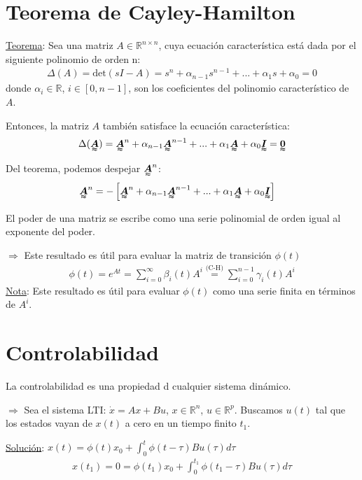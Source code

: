 \section{Teorema de Cayley-Hamilton}
\underline{Teorema}: Sea una matriz $A\in\mathbb{R}^{n\times n}$, cuya ecuación característica está dada por el siguiente polinomio de orden n:
\begin{align*}
    \Delta (A)=\text{det}(sI-A)=s^n+\alpha_{n-1}s^{n-1}+...+\alpha_1s+\alpha_0=0
\end{align*}
donde $\alpha_i\in\mathbb{R}$, $i\in [0,n-1]$, son los coeficientes del polinomio característico de $A$. \\
\par Entonces, la matriz $A$ también satisface la ecuación característica:
\begin{align*}
    \Delta (\tenq{A})=\tenq{A}^n+\alpha_{n-1}\tenq{A}^{n-1}+...+\alpha_1\tenq{A}+\alpha_0\tenq{I}=\tenq{0}
\end{align*}

Del teorema, podemos despejar $\tenq{A}^n$:
\begin{align*}
    \tenq{A}^n &= -\left[\tenq{A}^n+\alpha_{n-1}\tenq{A}^{n-1}+...+\alpha_1\tenq{A}+\alpha_0\tenq{I} \right]
\end{align*}

El poder de una matriz se escribe como una serie polinomial de orden igual al exponente del poder.\\
\par $\Longrightarrow$ Este resultado es útil para evaluar la matriz de transición $\phi(t)$
\begin{align*}
    \phi(t)=e^{At}=\sum_{i=0}^\infty \beta_i(t)A^i \overset{\text{(C-H)}}{=} \sum_{i=0}^{n-1}\gamma_i(t)A^i
\end{align*}
\underline{Nota}: Este resultado es útil para evaluar $\phi(t)$ como una serie finita en términos de $A^i$.

\section{Controlabilidad}
La controlabilidad es una propiedad d cualquier sistema dinámico.\\
\par $\Longrightarrow$ Sea el sistema LTI: $\dot{x}=Ax+Bu$, $x\in \mathbb{R}^n$, $u\in\mathbb{R}^p$. Buscamos $u(t)$ tal que los estados vayan de $x(t)$ a cero en un tiempo finito $t_1$. \\
\par \underline{Solución}: $x(t)=\phi(t)x_0+\int_0^t \phi(t-\tau)Bu(\tau)d\tau$
\begin{align*}
    x(t_1)=0=\phi(t_1)x_0+\int_0^{t_1} \phi(t_1-\tau)Bu(\tau)d\tau
\end{align*}

